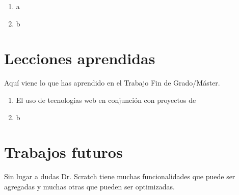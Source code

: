 \documentclass[a4paper, 12pt]{book}
\begin{document}
\begin{enumerate}
  \item a
  \item b
\end{enumerate}


\section{Lecciones aprendidas}
\label{sec:lecciones_aprendidas}

Aquí viene lo que has aprendido en el Trabajo Fin de Grado/Máster.

\begin{enumerate}
  \item El uso de tecnologías web en conjunción con proyectos de
  \item b
\end{enumerate}


\section{Trabajos futuros}
\label{sec:trabajos_futuros}


Sin lugar a dudas Dr. Scratch tiene muchas funcionalidades que puede ser agregadas
y muchas otras que pueden ser optimizadas.
\end{document}
